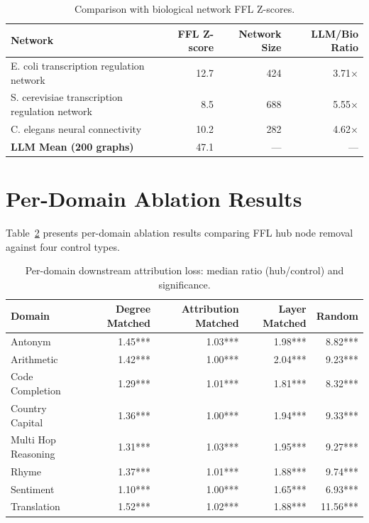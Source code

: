 \documentclass[11pt,a4paper]{article}
\begin{document}
\begin{table}[htbp]
\centering
\caption{Comparison with biological network FFL Z-scores.}
\label{tab:bio-comparison}
\begin{tabular}{lrrr}
\toprule
Network & FFL Z-score & Network Size & LLM/Bio Ratio \\
\midrule
E. coli transcription regulation network & 12.7 & 424 & 3.71$\times$ \\
S. cerevisiae transcription regulation network & 8.5 & 688 & 5.55$\times$ \\
C. elegans neural connectivity & 10.2 & 282 & 4.62$\times$ \\
\midrule
\textbf{LLM Mean (200 graphs)} & 47.1 & --- & --- \\
\bottomrule
\end{tabular}
\end{table}


\section{Per-Domain Ablation Results}
Table~\ref{tab:ablation-domain} presents per-domain ablation results comparing FFL hub node removal against four control types.

\begin{table}[htbp]
\centering
\footnotesize
\caption{Per-domain downstream attribution loss: median ratio (hub/control) and significance.}
\label{tab:ablation-domain}
\begin{tabular}{lrrrr}
\toprule
Domain & Degree Matched & Attribution Matched & Layer Matched & Random \\
\midrule
\rowcolor{rowgray}
Antonym & 1.45*** & 1.03*** & 1.98*** & 8.82*** \\
Arithmetic & 1.42*** & 1.00*** & 2.04*** & 9.23*** \\
\rowcolor{rowgray}
Code Completion & 1.29*** & 1.01*** & 1.81*** & 8.32*** \\
Country Capital & 1.36*** & 1.00*** & 1.94*** & 9.33*** \\
\rowcolor{rowgray}
Multi Hop Reasoning & 1.31*** & 1.03*** & 1.95*** & 9.27*** \\
Rhyme & 1.37*** & 1.01*** & 1.88*** & 9.74*** \\
\rowcolor{rowgray}
Sentiment & 1.10*** & 1.00*** & 1.65*** & 6.93*** \\
Translation & 1.52*** & 1.02*** & 1.88*** & 11.56*** \\
\bottomrule
\end{tabular}
\end{table}
\end{document}
